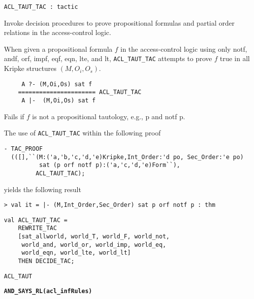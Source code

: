 \begin{verbatim}
ACL_TAUT_TAC : tactic
\end{verbatim}

\SYNOPSIS Invoke decision procedures to prove propositional formulas
and partial order relations in the access-control logic.

\DESCRIBE When given a propositional formula $f$ in the access-control
logic using only notf, andf, orf, impf, eqf, eqn, lte, and lt,
\texttt{ACL_TAUT_TAC} attempts to prove $f$ true in all Kripke
structures $(M,O_i,O_s)$.
\begin{verbatim}
     A ?- (M,Oi,Os) sat f
    ====================== ACL_TAUT_TAC 
     A |-  (M,Oi,Os) sat f
\end{verbatim}

\FAILURE
Fails if $f$ is not a propositional tautology, e.g., p and notf p.

\EXAMPLE
The use of \texttt{ACL\_TAUT\_TAC} within the following proof
\begin{holboxed}
\begin{verbatim}
- TAC_PROOF 
  (([],``(M:('a,'b,'c,'d,'e)Kripke,Int_Order:'d po, Sec_Order:'e po) 
          sat (p orf notf p):('a,'c,'d,'e)Form``),
         ACL_TAUT_TAC);
\end{verbatim}
\end{holboxed}
yields the following result
\begin{holboxed}
\begin{verbatim}
> val it = |- (M,Int_Order,Sec_Order) sat p orf notf p : thm
\end{verbatim}
\end{holboxed}

\IMPLEMENTATION
\begin{holboxed}
\begin{verbatim}
val ACL_TAUT_TAC =
    REWRITE_TAC 
    [sat_allworld, world_T, world_F, world_not, 
     world_and, world_or, world_imp, world_eq,
     world_eqn, world_lte, world_lt]
    THEN DECIDE_TAC;
\end{verbatim}
\end{holboxed}

\SEEALSO
\texttt{ACL\_TAUT}
\ENDDOC

\begin{holboxed}
  \begin{Large}
    \textbf{\texttt{AND_SAYS_RL}}\hfill{}\textbf{\texttt{(acl\_infRules)}}
  \end{Large}
\end{holboxed}

